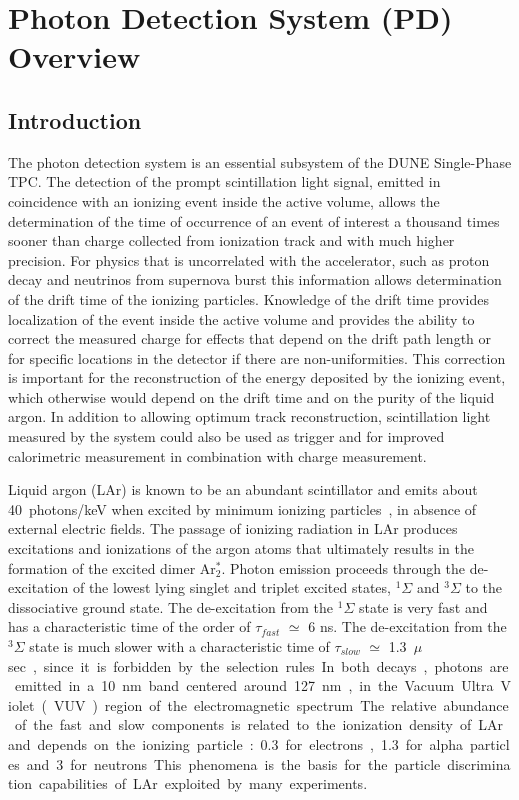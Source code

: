 \section{Photon Detection System (PD) Overview}
\label{sec:fdsp-pd-ov}

\subsection{Introduction}
\label{sec:fdsp-pd-intro}

The photon detection system is an essential subsystem of the DUNE Single-Phase TPC. The detection of the prompt scintillation light signal, emitted in coincidence with an ionizing event inside the active volume, allows the determination of the time of occurrence of an event of interest a thousand times sooner than charge collected from ionization track and with much higher precision. For physics that is uncorrelated with the accelerator, such as proton decay and neutrinos from supernova burst  this information allows determination of the drift time of the ionizing particles.
Knowledge of the drift time provides localization of the event inside the active volume and provides the ability to correct the measured charge for  effects that depend on the drift path length or for specific locations in the detector if there are non-uniformities.  This correction is important for the reconstruction of the energy deposited by the ionizing event, which otherwise would depend on the drift time and on the purity of the liquid argon. In addition to allowing optimum track reconstruction, scintillation light measured by the system could also be used as trigger and for improved calorimetric measurement in combination with charge measurement.

Liquid argon (LAr) is known to be an abundant scintillator and emits about \SI{40}{photons/keV} when excited  by minimum ionizing particles~\cite{ref:lar-scint}, in absence of external electric fields. The passage of ionizing radiation in LAr produces excitations 
and ionizations of the argon atoms that ultimately results in the formation of the 
excited dimer Ar$^*_2$.  Photon emission proceeds through the de-excitation 
of the lowest lying singlet and triplet excited states, $^{1}\Sigma$ and 
$^{3}\Sigma$ to the dissociative ground state. The de-excitation from the 
$^{1}\Sigma$ state is very fast and has a characteristic time of the order of 
$\tau_{fast}$ $\simeq$ 6 ns. The de-excitation from the $^{3}\Sigma$ state is 
much slower with a characteristic time of $\tau_{slow}$ $\simeq$ \SI{1.3}{$\mu$sec}, 
since it is forbidden by the selection rules. 
In both decays, photons are emitted in a \SI{10}{nm} band centered around \SI{127}{nm}, in 
the Vacuum Ultra Violet (VUV) region of the electromagnetic spectrum.
The relative abundance of the  fast and slow components is related to the ionization density of LAr and 
depends on the ionizing particle: \num{0.3} for electrons, \num{1.3} for alpha 
particles and \num{3} for neutrons. This phenomena is the basis for the  
particle discrimination capabilities of LAr exploited by many 
experiments.

